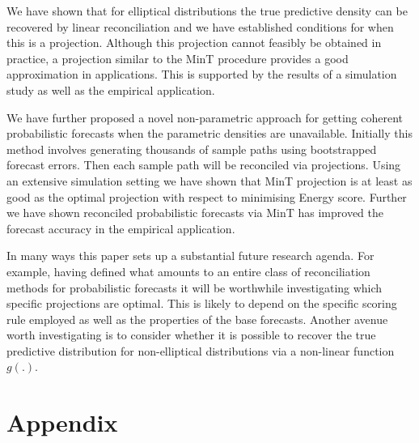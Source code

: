 \documentclass[12pt]{article}
\theoremstyle{definition}
\begin{document}
We have shown that for elliptical distributions the true predictive density can be recovered by linear reconciliation and we have established conditions for when this is a projection. Although this projection cannot feasibly be obtained in practice, a projection similar to the MinT procedure provides a good approximation in applications. This is supported by the results of a simulation study as well as the empirical application. 

We have further proposed a novel non-parametric approach for getting coherent probabilistic forecasts when the parametric densities are unavailable. Initially this method involves generating thousands of sample paths using bootstrapped forecast errors. Then each sample path will be reconciled via projections. Using an extensive simulation setting we have shown that MinT projection is at least as good as the optimal projection with respect to minimising Energy score. Further we have shown reconciled probabilistic forecasts via MinT has improved the forecast accuracy in the empirical application.     


In many ways this paper sets up a substantial future research agenda. For example, having defined what amounts to an entire class of reconciliation methods for probabilistic forecasts it will be worthwhile investigating which specific projections are optimal. This is likely to depend on the specific scoring rule employed as well as the properties of the base forecasts. Another avenue worth investigating is to consider whether it is possible to recover the true predictive distribution for non-elliptical distributions via a non-linear function $g(.)$.

\section{Appendix}



\newpage




\end{document}
